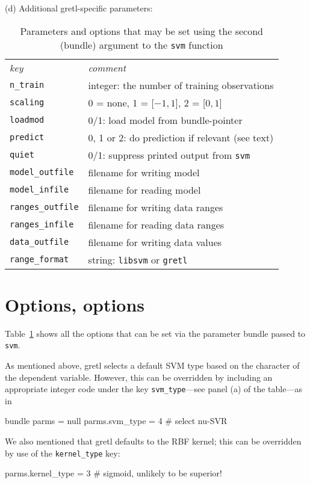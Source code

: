 \documentclass{article}
\begin{document}
\begin{table}[p]
  (d) Additional gretl-specific parameters:
  \begin{center}
  \begin{tabular}{ll}
    \textit{key} & \textit{comment} \\[2pt]
    \texttt{n\_train} & integer: the number of training observations \\
    \texttt{scaling} & 0 = none, 1 = [$-1,1$], 2 = [$0,1$] \\
    \texttt{loadmod} & 0/1: load model from bundle-pointer \\
    \texttt{predict} & 0, 1 or 2: do prediction if relevant (see text) \\
    \texttt{quiet} & 0/1: suppress printed output from \texttt{svm} \\
    \texttt{model\_outfile} & filename for writing model \\
    \texttt{model\_infile} & filename for reading model \\
    \texttt{ranges\_outfile} & filename for writing data ranges \\
    \texttt{ranges\_infile} & filename for reading data ranges \\
    \texttt{data\_outfile} & filename for writing data values \\
    \texttt{range\_format} & string: \texttt{libsvm} or \texttt{gretl}
  \end{tabular}
  \end{center}
  \caption{Parameters and options that may be set using the second
    (bundle) argument to the \texttt{svm} function}
  \label{tab:options}
\end{table}

\section{Options, options}
\label{sec:options}

Table~\ref{tab:options} shows all the options that can be set via the
parameter bundle passed to \texttt{svm}.

As mentioned above, gretl selects a default SVM type based on the
character of the dependent variable. However, this can be overridden
by including an appropriate integer code under the key
\texttt{svm\_type}---see panel (a) of the table---as in
\begin{code}
bundle parms = null
parms.svm_type = 4 # select nu-SVR
\end{code}
We also mentioned that gretl defaults to the RBF kernel; this can be
overridden by use of the \texttt{kernel\_type} key:
\begin{code}
parms.kernel_type = 3 # sigmoid, unlikely to be superior!
\end{code}
\end{document}
